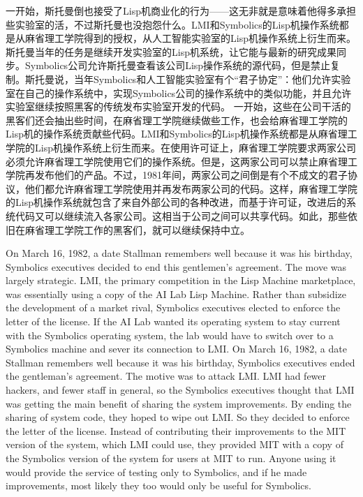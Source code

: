 \ifdefined\chs
\ifdefined\vone
一开始，斯托曼倒也接受了Lisp机商业化的行为——这无非就是意味着他得多承担些实验室的活，不过斯托曼也没抱怨什么。LMI和Symbolics的Lisp机操作系统都是从麻省理工学院得到的授权，从人工智能实验室的Lisp机操作系统上衍生而来。斯托曼当年的任务是继续开发实验室的Lisp机系统，让它能与最新的研究成果同步。Symbolics公司允许斯托曼查看该公司Lisp操作系统的源代码，但是禁止复制。斯托曼说，当年Symbolics和人工智能实验室有个``君子协定''：他们允许实验室在自己的操作系统中，实现Symbolics公司的操作系统中的类似功能，并且允许实验室继续按照黑客的传统发布实验室开发的代码。
\fi
\ifdefined\vtwo
一开始，这些在公司干活的黑客们还会抽出些时间，在麻省理工学院继续做些工作，也会给麻省理工学院的Lisp机的操作系统贡献些代码。LMI和Symbolics的Lisp机操作系统都是从麻省理工学院的Lisp机操作系统上衍生而来。在使用许可证上，麻省理工学院要求两家公司必须允许麻省理工学院使用它们的操作系统。但是，这两家公司可以禁止麻省理工学院再发布他们的产品。不过，1981年间，两家公司之间倒是有个不成文的君子协议，他们都允许麻省理工学院使用并再发布两家公司的代码。这样，麻省理工学院的Lisp机操作系统就包含了来自外部公司的各种改进，而基于许可证，改进后的系统代码又可以继续流入各家公司。这相当于公司之间可以共享代码。如此，那些依旧在麻省理工学院工作的黑客们，就可以继续保持中立。
\fi
\fi

\ifdefined\eng
\ifdefined\vone
On March 16, 1982, a date Stallman remembers well because it was his birthday, Symbolics executives decided to end this gentlemen's agreement. The move was largely strategic. LMI, the primary competition in the Lisp Machine marketplace, was essentially using a copy of the AI Lab Lisp Machine. Rather than subsidize the development of a market rival, Symbolics executives elected to enforce the letter of the license. If the AI Lab wanted its operating system to stay current with the Symbolics operating system, the lab would have to switch over to a Symbolics machine and sever its connection to LMI.
\fi
\ifdefined\vtwo
On March 16, 1982, a date Stallman remembers well because it was his birthday, Symbolics executives ended the gentleman's agreement. The motive was to attack LMI. LMI had fewer hackers, and fewer staff in general, so the Symbolics executives thought that LMI was getting the main benefit of sharing the system improvements.  By ending the sharing of system code, they hoped to wipe out LMI.  So they decided to enforce the letter of the license.  Instead of contributing their improvements to the MIT version of the system, which LMI could use, they provided MIT with a copy of the Symbolics version of the system for users at MIT to run.  Anyone using it would provide the service of testing only to Symbolics, and if he made improvements, most likely they too would only be useful for Symbolics.
\fi
\fi

